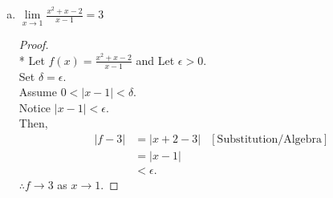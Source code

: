 \documentclass[a4paper]{article}
\newcommand{\eps}{\epsilon}
\newcommand{\del}{\delta}
\begin{document}
\begin{flushleft}
\begin{enumerate}[a.]
            \item $\lim\limits_{x \to 1} \frac{x^2 + x - 2}{x - 1} = 3$
            
            \begin{proof}\mbox{}\\*
                Let $f(x) = \frac{x^2 + x -2}{x-1}$ and Let $\eps > 0$. \\ 
                Set $\del = \eps$. \\
                Assume $0 < \left| x - 1 \right| < \del $. \\
                Notice $\left| x - 1 \right| < \eps$. \\
                Then, 
                \begin{align*}
                    |f - 3| &= |x+2 -3| & [\text{Substitution/Algebra}]\\
                            &= |x-1| \\
                            &< \eps.
                \end{align*}
                $\therefore f \to 3$ as $x \to 1$.
            \end{proof}

        \end{enumerate} 

    \end{flushleft}
\end{document}
